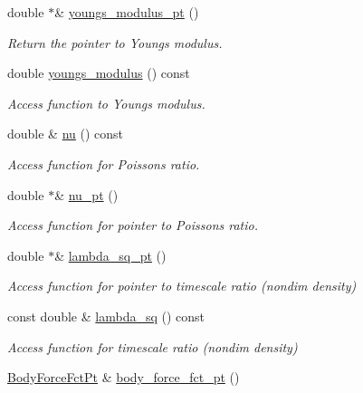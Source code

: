 \begin{DoxyCompactItemize}
double $\ast$\& \hyperlink{classoomph_1_1AxisymmetricLinearElasticityEquationsBase_aa57bf5389ce79d81fe1ba6dce32b6263}{youngs\+\_\+modulus\+\_\+pt} ()
\begin{DoxyCompactList}\small\item\em Return the pointer to Young\textquotesingle{}s modulus. \end{DoxyCompactList}\item 
double \hyperlink{classoomph_1_1AxisymmetricLinearElasticityEquationsBase_a8e7ec15db5634c6fd8fac7a848baf19d}{youngs\+\_\+modulus} () const
\begin{DoxyCompactList}\small\item\em Access function to Young\textquotesingle{}s modulus. \end{DoxyCompactList}\item 
double \& \hyperlink{classoomph_1_1AxisymmetricLinearElasticityEquationsBase_a73ee5401b8cfcd059cec299c0e0ff616}{nu} () const
\begin{DoxyCompactList}\small\item\em Access function for Poisson\textquotesingle{}s ratio. \end{DoxyCompactList}\item 
double $\ast$\& \hyperlink{classoomph_1_1AxisymmetricLinearElasticityEquationsBase_a8d4444efaba59fb74e5c68b78e67d616}{nu\+\_\+pt} ()
\begin{DoxyCompactList}\small\item\em Access function for pointer to Poisson\textquotesingle{}s ratio. \end{DoxyCompactList}\item 
double $\ast$\& \hyperlink{classoomph_1_1AxisymmetricLinearElasticityEquationsBase_ab001e2105e0f6e606299bdf8e7b8189e}{lambda\+\_\+sq\+\_\+pt} ()
\begin{DoxyCompactList}\small\item\em Access function for pointer to timescale ratio (nondim density) \end{DoxyCompactList}\item 
const double \& \hyperlink{classoomph_1_1AxisymmetricLinearElasticityEquationsBase_a7e165403d6dad7263f10fe65b3f60301}{lambda\+\_\+sq} () const
\begin{DoxyCompactList}\small\item\em Access function for timescale ratio (nondim density) \end{DoxyCompactList}\item 
\hyperlink{classoomph_1_1AxisymmetricLinearElasticityEquationsBase_afa35b69a888eecae4b5f199a1adf88c5}{Body\+Force\+Fct\+Pt} \& \hyperlink{classoomph_1_1AxisymmetricLinearElasticityEquationsBase_ae7bcc29e716871544ba2742a282a58dc}{body\+\_\+force\+\_\+fct\+\_\+pt} ()

\end{DoxyCompactItemize}
